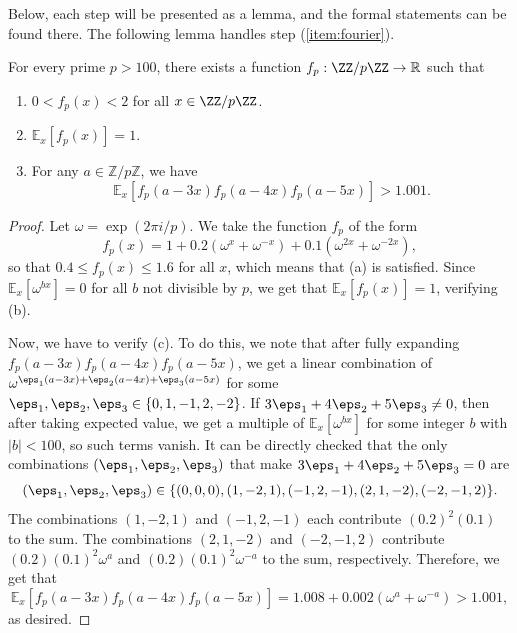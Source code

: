 \documentclass[11pt,reqno]{amsart}
\begin{document}
Below, each step will be presented as a lemma,
and the formal statements can be found there.
The following lemma handles step (\ref{item:fourier}).
\begin{lemma}
\label{lem:fourier}
For every prime $p>100$, there exists a function $f_p  :\ZZ/p\ZZ\to \mathbb R$ such that
\begin{enumerate}[label=(\alph*)]
    \item $0<f_p(x) < 2$ for all $x\in\ZZ/p\ZZ$.
    \item $\mathbb E_x[f_p(x)] = 1$.
    \item For any $a\in \mathbb Z/p\mathbb Z$, we have 
    $$\mathbb E_x[f_p(a-3x)f_p(a-4x)f_p(a-5x)] 
    > 1.001.$$
\end{enumerate}
\end{lemma}
\begin{proof}
Let $\omega = \exp(2\pi i/p)$. 
We take the function $f_p$ of the form
$$f_p(x) = 1+0.2(\omega^x+\omega^{-x}) + 0.1(\omega^{2x}+\omega^{-2x}),$$
so that $0.4 \leq f_p(x)\leq 1.6$ for all $x$,
which means that (a) is satisfied.
Since $\mathbb E_x[\omega^{bx}]=0$ for all $b$ not divisible by $p$,
we get that $\mathbb E_x[f_p(x)]=1$, verifying (b).

Now, we have to verify (c).
To do this, we note that after fully expanding 
$f_p(a-3x)f_p(a-4x)f_p(a-5x)$, we get a linear combination of
$\omega^{\eps_1(a-3x) + \eps_2(a-4x) + \eps_3(a-5x)}$
for some $\eps_1,\eps_2,\eps_3\in\{0,1,-1,2,-2\}$.
If $3\eps_1 + 4\eps_2 + 5\eps_3 \neq 0$,
then after taking expected value, 
we get a multiple of $\mathbb E_x[\omega^{bx}]$
for some integer $b$ with $|b|<100$, 
so such terms vanish.
It can be directly checked that
the only combinations $(\eps_1,\eps_2,\eps_3)$
that make $3\eps_1+4\eps_2+5\eps_3=0$ are 
$$(\eps_1,\eps_2,\eps_3) \in \{(0,0,0), 
(1,-2,1), (-1,2,-1), (2,1,-2), (-2,-1,2)\}.$$
The combinations $(1,-2,1)$ and $(-1,2,-1)$
each contribute $(0.2)^2 (0.1)$ to the sum.
The combinations 
$(2,1,-2)$ and $(-2,-1,2)$ contribute
$(0.2)(0.1)^2 \omega^a$ and $(0.2)(0.1)^2 \omega^{-a}$
to the sum, respectively.
Therefore, we get that 
$$\mathbb E_x[f_p(a-3x)f_p(a-4x)f_p(a-5x)]
= 1.008 + 0.002(\omega^a + \omega^{-a}) 
> 1.001,$$
as desired.
\end{proof}
\end{document}
